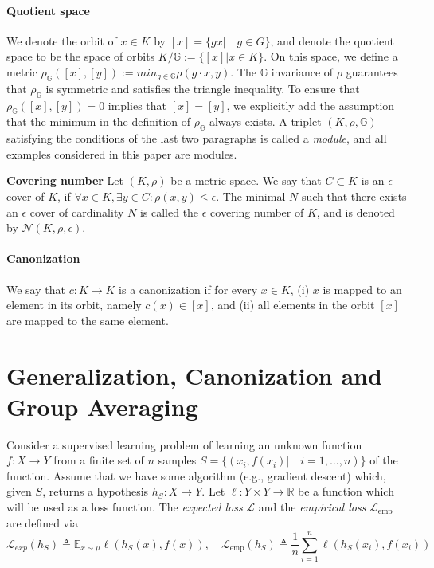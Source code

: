 \documentclass{article}
\theoremstyle{definition}
\theoremstyle{plain}
\newcommand{\G}{\mathbb{G}}
\newcommand{\N}{\mathcal{N}}
\newcommand{\RR}{\mathbb{R}}
\newcommand{\Lemp}{\mathcal{L}_{\mathrm{emp}}}
\begin{document}
\paragraph{Quotient space} We denote the orbit of $x\in K$ by  $[x]=\{gx| \quad g\in G \}$, and denote the quotient space to be the space of orbits $K/\G:=\{[x]|x \in K\}$. On this space, we define a metric $\rho_\G([x],[y]):=min_{g \in \G}\rho(g\cdot x,y)$. The $\G$ invariance of $\rho$ guarantees that $\rho_{\G}$ is symmetric and satisfies the triangle inequality. To ensure that $\rho_{\G}([x],[y])=0 $ implies that $[x]=[y]$, we explicitly add the assumption that the minimum in the definition of $\rho_\G$ always exists. A triplet $(K,\rho,\G)$ satisfying the conditions of the last two paragraphs is called a \emph{module}, and all examples considered in this paper are modules.

\textbf{Covering number}
Let $(K,\rho)$ be a metric space. We say that $C \subset K$ is an $\epsilon$ cover of $K$,  if $\forall x \in K, \exists y \in C: \rho(x,y)\leq  \epsilon$. The minimal $N$ such that there exists an $\epsilon$ cover of cardinality $N$ is called the $\epsilon$ covering number of $K$, and is denoted by $\N(K,\rho,\epsilon)$. 

\paragraph{Canonization} 
We say that $c:K \rightarrow K$ is a canonization if for every $x\in K$, (i) $x$ is mapped to an element in its orbit, namely $c(x)\in [x]$, and (ii) all elements in the orbit $[x]$ are mapped to the same element. 

\section{Generalization, Canonization and Group Averaging}\label{sec:gen}
Consider a supervised learning problem of learning an unknown function $f:X\to Y $ from a finite set of $n$ samples $S=\{(x_i,f(x_i)| \quad i=1,\ldots,n) \}$ of the function. Assume that we have some algorithm (e.g., gradient descent) which, given $S$, returns a hypothesis $h_S:X \to Y $. Let $\ell:Y \times Y \to \RR  $ be a function which will be used as a loss function. The \emph{expected loss} $\mathcal{L}$ and the \emph{empirical loss} $\Lemp $ are defined via 
$$\mathcal{L}_{exp}(h_S) \triangleq \mathbb{E}_{x \sim \mu} \ell(h_S(x),f(x)), \quad \Lemp(h_S)\triangleq\frac{1}{n}\sum_{i=1}^n \ell(h_S(x_i),f(x_i))$$
\end{document}
